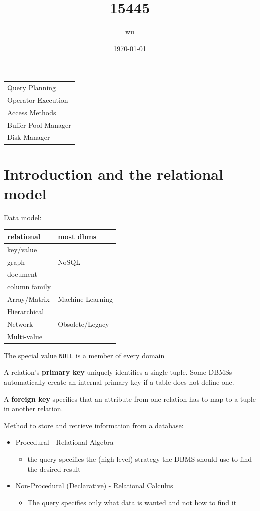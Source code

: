 \documentclass[11pt]{article}
\author{wu}
\date{\today}
\title{15445}
\begin{document}
\maketitle
\tableofcontents

\begin{center}
\begin{tabular}{l}
Query Planning\\
Operator Execution\\
Access Methods\\
Buffer Pool Manager\\
Disk Manager\\
\end{tabular}
\end{center}
\section{Introduction and the relational model}
\label{sec:orge48b489}
Data model:

\begin{center}
\begin{tabular}{ll}
relational & most dbms\\
\hline
key/value & \\
graph & NoSQL\\
document & \\
column family & \\
\hline
Array/Matrix & Machine Learning\\
\hline
Hierarchical & \\
Network & Obsolete/Legacy\\
Multi-value & \\
\end{tabular}
\end{center}


The special value \texttt{NULL} is a member of every domain

A relation's \textbf{primary key} uniquely identifies a single tuple. Some DBMSs automatically create an
internal primary key if a table does not define one.

A \textbf{foreign key} specifies that an attribute from one relation has to map to a tuple in another
relation.

Method to store and retrieve information from a database:
\begin{itemize}
\item Procedural - Relational Algebra
\begin{itemize}
\item the query specifies the (high-level) strategy the DBMS should use to find the desired result
\end{itemize}
\item Non-Procedural (Declarative) - Relational Calculus
\begin{itemize}
\item The query specifies only what data is wanted and not how to find it
\end{itemize}
\end{itemize}
\end{document}

